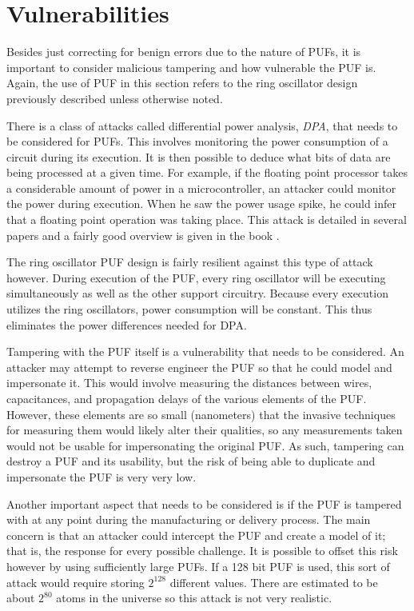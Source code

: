 \section{Vulnerabilities}
Besides just correcting for benign errors due to the nature of PUFs, it is important to consider
malicious tampering and how vulnerable the PUF is. Again, the use of PUF in this section refers
to the ring oscillator design previously described unless otherwise noted.

There is a class of attacks called differential power analysis, \textit{DPA}, that needs to be considered
for PUFs. This involves monitoring the power consumption of a circuit during its execution. It is then possible
to deduce what bits of data are being processed at a given time. For example, if the floating point processor
takes a considerable amount of power in a microcontroller, an attacker could monitor the power during execution.
When he saw the power usage spike, he could infer that a floating point operation was taking place. This attack
is detailed in several papers and a fairly good overview is given in the book \cite{securityengineering}.

The ring oscillator PUF design is fairly resilient against this type of attack however. During execution of the
PUF, every ring oscillator will be executing simultaneously as well as the other support circuitry. Because
every execution utilizes the ring oscillators, power consumption will be constant. This thus eliminates the
power differences needed for DPA.

Tampering with the PUF itself is a vulnerability that needs to be considered. An attacker may attempt
to reverse engineer the PUF so that he could model and impersonate it. This would involve measuring
the distances between wires, capacitances, and propagation delays of the various elements of the PUF.
However, these elements are so small (nanometers) that the invasive techniques for measuring them
would likely alter their qualities, so any measurements taken would not be usable for impersonating
the original PUF. As such, tampering can destroy a PUF and its usability, but the risk of being able
to duplicate and impersonate the PUF is very very low.

Another important aspect that needs to be considered is if the PUF is tampered with at any point
during the manufacturing or delivery process. The main concern is that an attacker could intercept
the PUF and create a model of it; that is, the response for every possible challenge. It is possible to
offset this risk however by using sufficiently large PUFs. If a 128 bit PUF is used, this sort of attack
would require storing $2^{128}$ different values. There are estimated to be about $2^80$ atoms
in the universe so this attack is not very realistic.

